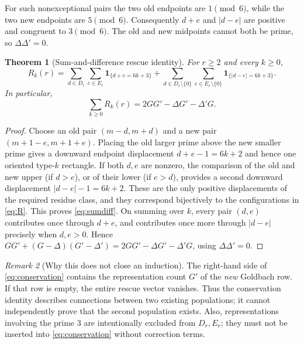 \documentclass[11pt,a4paper]{article}
\newtheorem{theorem}{Theorem}[section]
\theoremstyle{definition}
\theoremstyle{remark}
\newtheorem{remark}[theorem]{Remark}
\newcommand{\ind}{\mathbf 1}
\begin{document}
For such nonexceptional pairs the two old endpoints are $1\pmod6$, while the two new endpoints are $5\pmod6$.  Consequently $d+e$ and $|d-e|$ are positive and congruent to $3\pmod6$.  The old and new midpoints cannot both be prime, so $\Delta\Delta'=0$.

\begin{theorem}[Sum-and-difference rescue identity]\label{thm:sumdifference}
For $r\ge2$ and every $k\ge0$,
\begin{equation}\label{eq:sumdiff}
 \boxed{\displaystyle
 R_k(r)=\sum_{d\in D_r}\sum_{e\in E_r}
 \ind_{\{d+e=6k+3\}}
 +\sum_{d\in D_r\setminus\{0\}}\sum_{e\in E_r\setminus\{0\}}
 \ind_{\{|d-e|=6k+3\}}.}
\end{equation}
In particular,
\begin{equation}\label{eq:conservation}
 \boxed{\displaystyle
 \sum_{k\ge0}R_k(r)=2GG'-\Delta G'-\Delta'G.}
\end{equation}
\end{theorem}
\begin{proof}
Choose an old pair $(m-d,m+d)$ and a new pair $(m+1-e,m+1+e)$.  Placing the old larger prime above the new smaller prime gives a downward endpoint displacement $d+e-1=6k+2$ and hence one oriented type-$k$ rectangle.  If both $d,e$ are nonzero, the comparison of the old and new upper (if $d>e$), or of their lower (if $e>d$), provides a second downward displacement $|d-e|-1=6k+2$.  These are the only positive displacements of the required residue class, and they correspond bijectively to the configurations in \eqref{eq:R}.  This proves \eqref{eq:sumdiff}.  On summing over $k$, every pair $(d,e)$ contributes once through $d+e$, and contributes once more through $|d-e|$ precisely when $d,e>0$. Hence
$GG'+(G-\Delta)(G'-\Delta')=2GG'-\Delta G'-\Delta'G$, using $\Delta\Delta'=0$.
\end{proof}

\begin{remark}[Why this does not close an induction]
The right-hand side of \eqref{eq:conservation} contains the representation count $G'$ of the \emph{new} Goldbach row. If that row is empty, the entire rescue vector vanishes. Thus the conservation identity describes connections between two existing populations; it cannot independently prove that the second population exists.  Also, representations involving the prime $3$ are intentionally excluded from $D_r,E_r$; they must not be inserted into \eqref{eq:conservation} without correction terms.
\end{remark}
\end{document}
